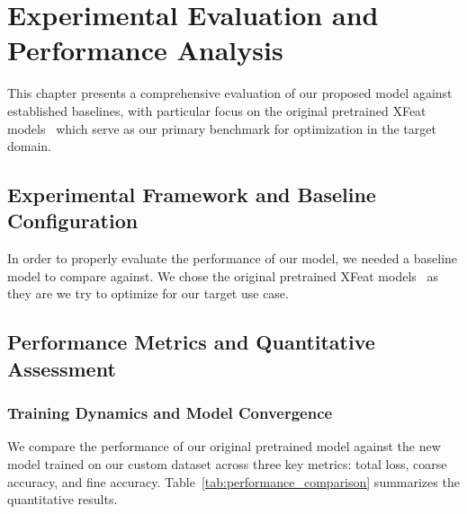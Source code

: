 \chapter{Experimental Evaluation and Performance Analysis}

This chapter presents a comprehensive evaluation of our proposed model against established baselines, with particular focus on the original pretrained XFeat models~\cite{xfeat_github} which serve as our primary benchmark for optimization in the target domain.

\section{Experimental Framework and Baseline Configuration}

In order to properly evaluate the performance of our model, we needed a baseline model to compare against. We chose the original pretrained XFeat models~\cite{xfeat_github} as they are we try to optimize for our target use case.

\section{Performance Metrics and Quantitative Assessment}

\subsection{Training Dynamics and Model Convergence}

We compare the performance of our original pretrained model against the new model trained on our custom dataset across three key metrics: total loss, coarse accuracy, and fine accuracy. Table~\ref{tab:performance_comparison} summarizes the quantitative results.

